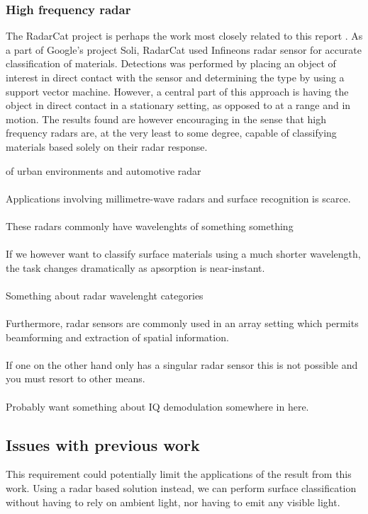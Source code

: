 
\subsubsection{High frequency radar}
The RadarCat project is perhaps the work most closely related to this report \citep{yeo_2016}. As a part of Google's project Soli, RadarCat used Infineons radar sensor for accurate classification of materials. Detections was performed by placing an object of interest in direct contact with the sensor and determining the type by using a support vector machine. However, a central part of this approach is having the object in direct contact in a stationary setting, as opposed to at a range and in motion. The results found are however encouraging in the sense that high frequency radars are, at the very least to some degree, capable of classifying materials based solely on their radar response. 

 of urban environments and automotive radar 
\\ \\
Applications involving millimetre-wave radars and surface recognition is scarce.  
\\ \\
These radars commonly have wavelenghts of something something
\\ \\
If we however want to classify surface materials using a much shorter wavelength, the task changes dramatically as apsorption is near-instant. 
\\ \\
Something about radar wavelenght categories
\\ \\
Furthermore, radar sensors are commonly used in an array setting which permits beamforming and extraction of spatial information. 
\\ \\
If one on the other hand only has a singular radar sensor this is not possible and you must resort to other means.
\\ \\
Probably want something about IQ demodulation somewhere in here.

\subsection{Issues with previous work}


This requirement could potentially limit the applications of the result from this work. Using a radar based solution instead, we can perform surface classification without having to rely on ambient light, nor having to emit any visible light.


